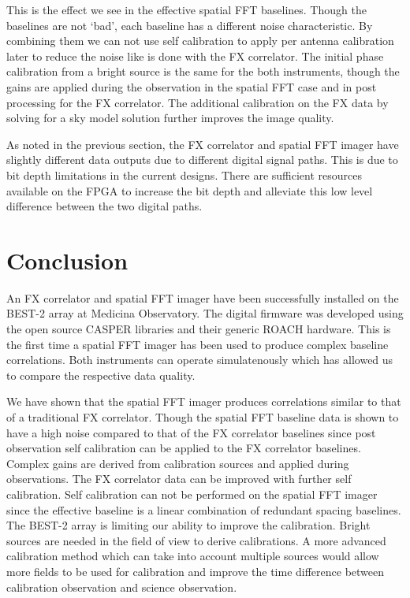 \documentclass[useAMS,macros,usenatbib]{mn2e}
\begin{document}
This is the effect we see in the effective spatial FFT baselines.
Though the baselines are not `bad', each baseline has a different noise characteristic.
By combining them we can not use self calibration to apply per antenna calibration later to reduce the noise like is done with the FX correlator.
The initial phase calibration from a bright source is the same for the both instruments, though the gains are applied during the observation in the spatial FFT case and in post processing for the FX correlator.
The additional calibration on the FX data by solving for a sky model solution further improves the image quality.

As noted in the previous section, the FX correlator and spatial FFT imager have slightly different data outputs due to different digital signal paths.
This is due to bit depth limitations in the current designs.
There are sufficient resources available on the FPGA to increase the bit depth and alleviate this low level difference between the two digital paths.

\section{Conclusion}
\label{conclusion}

An FX correlator and spatial FFT imager have been successfully installed on the BEST-2 array at Medicina Observatory.
The digital firmware was developed using the open source CASPER libraries and their generic ROACH hardware.
This is the first time a spatial FFT imager has been used to produce complex baseline correlations.
Both instruments can operate simulatenously which has allowed us to compare the respective data quality.

We have shown that the spatial FFT imager produces correlations similar to that of a traditional FX correlator.
Though the spatial FFT baseline data is shown to have a high noise compared to that of the FX correlator baselines since post observation self calibration can be applied to the FX correlator baselines.
Complex gains are derived from calibration sources and applied during observations.
The FX correlator data can be improved with further self calibration.
Self calibration can not be performed on the spatial FFT imager since the effective baseline is a linear combination of redundant spacing baselines.
The BEST-2 array is limiting our ability to improve the calibration.
Bright sources are needed in the field of view to derive calibrations.
A more advanced calibration method which can take into account multiple sources would allow more fields to be used for calibration and improve the time difference between calibration observation and science observation.
\end{document}
